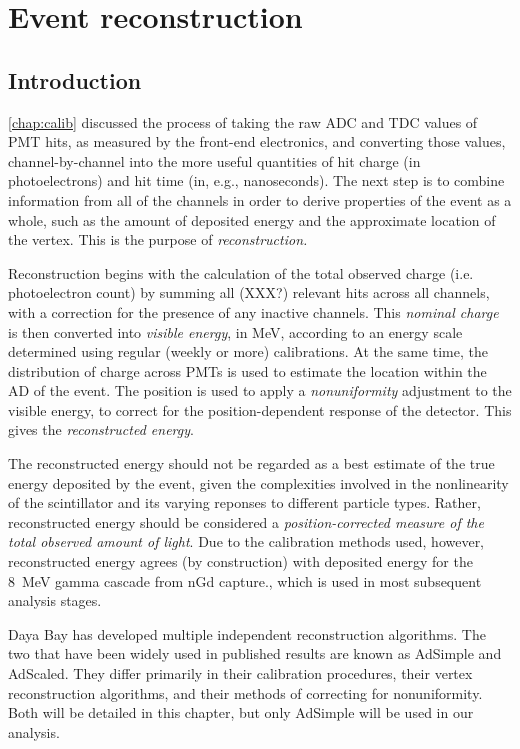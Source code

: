 \documentclass[../thesis.tex]{subfiles}
\begin{document}
\chapter{Event reconstruction}
\label{chap:recon}

\section{Introduction}

\autoref{chap:calib} discussed the process of taking the raw ADC and TDC values of PMT hits, as measured by the front-end electronics, and converting those values, channel-by-channel into the more useful quantities of hit charge (in photoelectrons) and hit time (in, e.g., nanoseconds). The next step is to combine information from all of the channels in order to derive properties of the event as a whole, such as the amount of deposited energy and the approximate location of the vertex. This is the purpose of \emph{reconstruction.}

Reconstruction begins with the calculation of the total observed charge (i.e. photoelectron count) by summing all (XXX?) relevant hits across all channels, with a correction for the presence of any inactive channels. This \emph{nominal charge} is then converted into \emph{visible energy}, in MeV, according to an energy scale determined using regular (weekly or more) calibrations. At the same time, the distribution of charge across PMTs is used to estimate the location within the AD of the event. The position is used to apply a \emph{nonuniformity} adjustment to the visible energy, to correct for the position-dependent response of the detector. This gives the \emph{reconstructed energy}.

The reconstructed energy should not be regarded as a best estimate of the true energy deposited by the event, given the complexities involved in the nonlinearity of the scintillator and its varying reponses to different particle types. Rather, reconstructed energy should be considered a \emph{position-corrected measure of the total observed amount of light}. Due to the calibration methods used, however, reconstructed energy agrees (by construction) with deposited energy for the 8~MeV gamma cascade from nGd capture., which is used in most subsequent analysis stages.

Daya Bay has developed multiple independent reconstruction algorithms. The two that have been widely used in published results are known as AdSimple and AdScaled. They differ primarily in their calibration procedures, their vertex reconstruction algorithms, and their methods of correcting for nonuniformity. Both will be detailed in this chapter, but only AdSimple will be used in our analysis.
\end{document}
